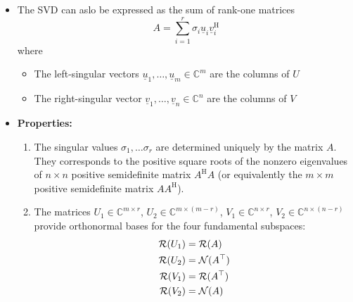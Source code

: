 \documentclass[11pt,twoside]{report}
\newcommand{\bbC}{{\mathbb{C}}}
\newcommand{\vecnot}{\underline}
\newcommand{\Herm}{{\mathrm{H}}}
\newcommand{\Span}{\mathrm{span}}
\begin{document}
\begin{itemize}
\item %
The SVD can aslo be expressed as the sum of rank-one matrices
\[
A = \sum_{i=1}^r \sigma_i \vecnot{u}_i \vecnot{v}_i^\Herm
\]
where 
\begin{itemize}
\item The left-singular vectors $\vecnot{u}_1, \dots, \vecnot{u}_m \in \bbC^m$ are the columns of $U$
\item The right-singular vector $ \vecnot{v}_1, \dots, \vecnot{v}_n \in\bbC^n$ are the columns of $V$
\end{itemize}

\item \textbf{Properties:} 
\begin{enumerate}[(1)]
\item The singular values $\sigma_1, \dots \sigma_r$ are determined uniquely by the matrix $A$.  They corresponds to the positive square roots of the nonzero eigenvalues of $n \times n$ positive semidefinite matrix $A^\Herm A$ (or equivalently the $m \times m$ positive semidefinite matrix $AA^\Herm$).  %
\item The matrices $U_1 \in \bbC^{m \times r}$, $U_2 \in \bbC^{m \times (m-r)}$, $V_1 \in \bbC^{n \times r}$, $V_2 \in \bbC^{n \times (n-r)}$ provide orthonormal bases for the four fundamental subspaces:
\begin{align*}
\mathcal{R}(U_1) & = \mathcal{R}(A)\\
\mathcal{R}(U_2) & = \mathcal{N}(A^\top)\\
\mathcal{R}(V_1) & = \mathcal{R}(A^\top)\\
\mathcal{R}(V_2) & = \mathcal{N}(A)
\end{align*}
\end{enumerate}



\end{itemize}
\end{document}

